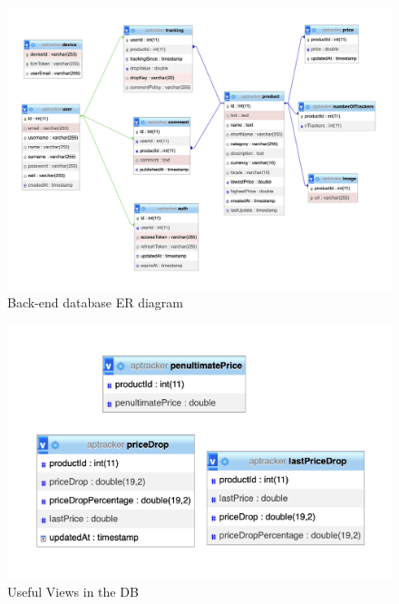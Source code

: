 \begin{figure}[h!]
        \centering
        \includegraphics[scale=0.35]{images/er_diagrams/db_er.png}
        \caption{Back-end database ER diagram}
        \label{fig:er_diagram}
\end{figure}
\FloatBarrier

\begin{figure}[h!]
        \centering
        \includegraphics[scale=0.45]{images/er_diagrams/er_views.png}
        \caption{Useful Views in the DB}
        \label{fig:er_views}
\end{figure}
\FloatBarrier


